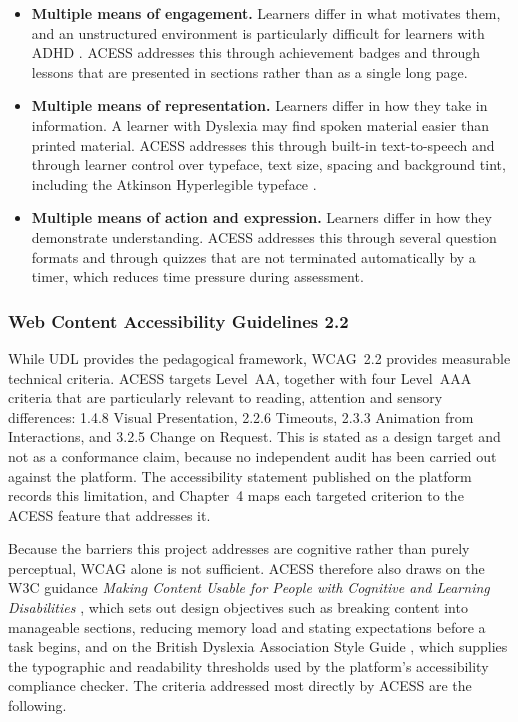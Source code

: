 \documentclass[12pt, oneside]{article} %
\begin{document}
\begin{itemize}
    \item \textbf{Multiple means of engagement.} Learners differ in what motivates them, and an unstructured environment is particularly difficult for learners with ADHD \cite{barkley1997adhd}. ACESS addresses this through achievement badges and through lessons that are presented in sections rather than as a single long page.
    \item \textbf{Multiple means of representation.} Learners differ in how they take in information. A learner with Dyslexia may find spoken material easier than printed material. ACESS addresses this through built-in text-to-speech and through learner control over typeface, text size, spacing and background tint, including the Atkinson Hyperlegible typeface \cite{atkinson2021atkinson}.
    \item \textbf{Multiple means of action and expression.} Learners differ in how they demonstrate understanding. ACESS addresses this through several question formats and through quizzes that are not terminated automatically by a timer, which reduces time pressure during assessment.
\end{itemize}

\subsubsection{Web Content Accessibility Guidelines 2.2}
\label{sec:wcag}
While UDL provides the pedagogical framework, WCAG~2.2 \cite{wcag22} provides measurable technical criteria. ACESS targets Level~AA, together with four Level~AAA criteria that are particularly relevant to reading, attention and sensory differences: 1.4.8 Visual Presentation, 2.2.6 Timeouts, 2.3.3 Animation from Interactions, and 3.2.5 Change on Request. This is stated as a design target and not as a conformance claim, because no independent audit has been carried out against the platform. The accessibility statement published on the platform records this limitation, and Chapter~4 maps each targeted criterion to the ACESS feature that addresses it.

Because the barriers this project addresses are cognitive rather than purely perceptual, WCAG alone is not sufficient. ACESS therefore also draws on the W3C guidance \emph{Making Content Usable for People with Cognitive and Learning Disabilities} \cite{wcag_cognitive}, which sets out design objectives such as breaking content into manageable sections, reducing memory load and stating expectations before a task begins, and on the British Dyslexia Association Style Guide \cite{bda_style_guide}, which supplies the typographic and readability thresholds used by the platform's accessibility compliance checker. The criteria addressed most directly by ACESS are the following.
\end{document}
